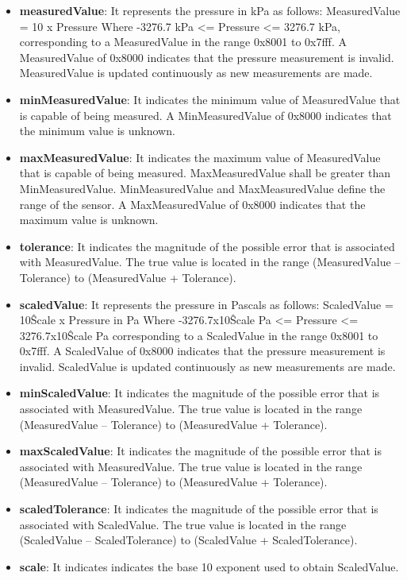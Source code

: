\begin{itemize}
\item \textbf{measuredValue}: It represents the pressure in kPa as follows: MeasuredValue = 10 x Pressure Where -3276.7 kPa <= Pressure <= 3276.7 kPa, corresponding to a MeasuredValue in the range 0x8001 to 0x7fff. A MeasuredValue of 0x8000 indicates that the pressure measurement is invalid. MeasuredValue is updated continuously as new measurements are made.
\item \textbf{minMeasuredValue}: It indicates the minimum value of MeasuredValue that is capable of being measured. A MinMeasuredValue of 0x8000 indicates that the minimum value is unknown.
\item \textbf{maxMeasuredValue}: It indicates the maximum value of MeasuredValue that is capable of being measured. MaxMeasuredValue shall be greater than MinMeasuredValue. MinMeasuredValue and MaxMeasuredValue define the range of the sensor. A MaxMeasuredValue of 0x8000 indicates that the maximum value is unknown.
\item \textbf{tolerance}: It indicates the magnitude of the possible error that is associated with MeasuredValue. The true value is located in the range (MeasuredValue – Tolerance) to (MeasuredValue + Tolerance).
\item \textbf{scaledValue}: It represents the pressure in Pascals as follows: ScaledValue = 10\^Scale x Pressure in Pa Where -3276.7x10\^Scale Pa <= Pressure <= 3276.7x10\^Scale Pa corresponding to a ScaledValue in the range 0x8001 to 0x7fff. A ScaledValue of 0x8000 indicates that the pressure measurement is invalid. ScaledValue is updated continuously as new measurements are made.
\item \textbf{minScaledValue}: It indicates the magnitude of the possible error that is associated with MeasuredValue. The true value is located in the range (MeasuredValue – Tolerance) to (MeasuredValue + Tolerance).
\item \textbf{maxScaledValue}: It indicates the magnitude of the possible error that is associated with MeasuredValue. The true value is located in the range (MeasuredValue – Tolerance) to (MeasuredValue + Tolerance).
\item \textbf{scaledTolerance}: It indicates the magnitude of the possible error that is associated with ScaledValue. The true value is located in the range (ScaledValue – ScaledTolerance) to (ScaledValue + ScaledTolerance).
\item \textbf{scale}: It indicates  indicates the base 10 exponent used to obtain ScaledValue.
\end{itemize}

